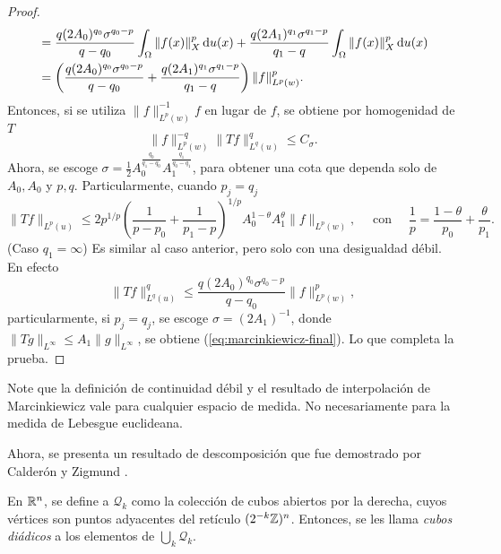 \begin{proof}
\begin{align*}
		& = \frac{q(2A_0)^{q_0}\sigma^{q_0-p}}{q-q_0} \int_\Omega \|f(x)\|_X^p \mathop{}\!\mathrm{d} u(x) + \frac{q(2A_1)^{q_1}\sigma^{q_1-p}}{q_1-q} \int_\Omega \|f(x)\|_X^p \mathop{}\!\mathrm{d} u(x) \\
		& = \left(\frac{q(2A_0)^{q_0}\sigma^{q_0-p}}{q-q_0} +\frac{q(2A_1)^{q_1}\sigma^{q_1-p}}{q_1-q} \right) \|f\|_{L^p(w)}^p.
	\end{align*}
	Entonces, si se utiliza $\|f\|_{L^p(w)}^{-1} f$ en lugar de $f$, se obtiene por homogenidad de $T$ 
	\begin{equation*}
	\|f\|_{L^p(w)}^{-q}	\|Tf\|_{L^q(u)}^q \leq C_\sigma.
	\end{equation*}
	Ahora, se escoge $\sigma=\frac{1}{2}A_0^{\frac{q_0}{q_1-q_0}}A_1^{\frac{q_1}{q_0-q_1}}$, para obtener una cota que dependa solo de $A_0,A_0$ y $p,q$. Particularmente, cuando $p_j =q_j$
	\begin{equation}\label{eq:marcinkiewicz-final}
		\|Tf\|_{L^p(u)} \leq 2p^{1/p}\left(\frac{1}{p-p_0}+\frac{1}{p_1-p}\right)^{1/p}A_0^{1-\theta}A_1^\theta\|f\|_{L^p(w)}, \quad \text{ con }\quad \frac{1}{p} = \frac{1-\theta}{p_0} + \frac{\theta}{p_1}.
	\end{equation}
	(Caso $q_1=\infty$) Es similar al caso anterior, pero solo con una desigualdad débil. En efecto 
	\begin{equation*}
		\|Tf\|_{L^q(u)}^q \leq \frac{q(2A_0)^{q_0}\sigma^{q_0-p}}{q-q_0} \|f\|_{L^p(w)}^p,
	\end{equation*}
	particularmente, si $p_j=q_j$, se escoge $\sigma = (2A_1)^{-1}$, donde $\|Tg\|_{L^\infty}\leq A_1\|g\|_{L^\infty}$, se obtiene (\ref{eq:marcinkiewicz-final}). Lo que completa la prueba.
\end{proof}
\begin{remark}
	Note que la definición de continuidad débil y el resultado de interpolación de Marcinkiewicz vale para cualquier espacio de medida. No necesariamente para la medida de Lebesgue euclideana.
\end{remark}
Ahora, se presenta un resultado de descomposición que fue demostrado por Calderón y Zigmund \cite{calderon-zygmund}.
\begin{definition}
	En $\mathbb{R}^n$, se define a $\mathcal{Q}_k$ como la colección de cubos abiertos por la derecha, cuyos vértices son puntos adyacentes del retículo $(2^{-k}\mathbb{Z})^n$. Entonces, se les llama \textit{cubos diádicos} a los elementos de $\bigcup_k \mathcal{Q}_k$.
\end{definition}
